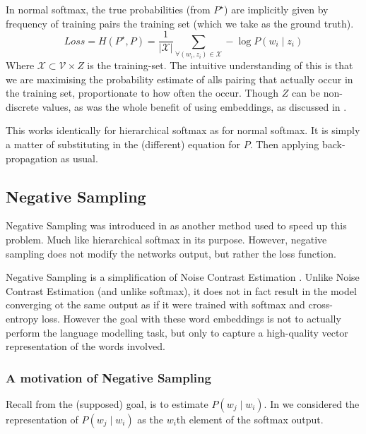 \documentclass[parskip]{komatufte}
\begin{document}
In normal softmax, the true probabilities (from $P^\star$) are implicitly given by frequency of training pairs the training set (which we take as the ground truth).
\begin{equation}
Loss=H(P^\star, P) = \frac{1}{|\mathcal{X}|} \sum_{\forall (w_i, z_i) \in \mathcal{X}} -\log P(w_i \mid z_i)
\end{equation}
Where $\mathcal{X} \subset \mathcal{V} \times Z$ is the training-set.
The intuitive understanding of this is that we are maximising the probability estimate of alls pairing that actually occur in the training set, proportionate to how often the occur.
Though $Z$ can be non-discrete values, as was the whole benefit of using embeddings, as discussed in .

This works identically for hierarchical softmax as for normal softmax.
It is simply a matter of substituting in the (different) equation for $P$.
Then applying back-propagation as usual.

\subsection{Negative Sampling}\label{sec:negative-sampling}


Negative Sampling was introduced in  as another method used to speed up this problem.
Much like hierarchical softmax in its purpose.
However, negative sampling does not modify the networks output, but rather the loss function.


Negative Sampling is a simplification of Noise Contrast Estimation .
Unlike Noise Contrast Estimation (and unlike softmax), it does not in fact result in the model converging ot the same output as if it were trained with softmax and cross-entropy loss.
However the goal with these word embeddings is not to actually perform the language modelling task, but only to capture a high-quality vector representation of the words involved.

\subsubsection{A motivation of Negative Sampling}
Recall from  the (supposed) goal, is to estimate $P(w_j\mid w_i)$.
In    we considered the representation of $P(w_j\mid w_i)$ as the $w_i$th element of the softmax output.
\end{document}
